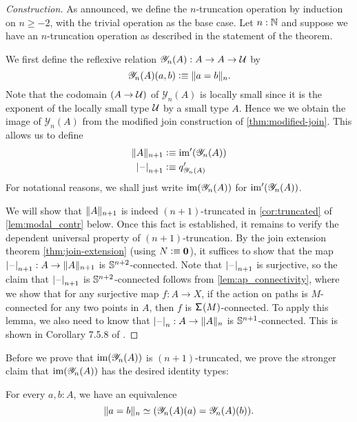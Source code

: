 \begin{proof}[Construction]
As announced, we define the $n$-truncation operation by induction on $n\geq-2$,
with the trivial operation as the base case. Let $n:\N$ and suppose we have
an $n$-truncation operation as described in the statement of the theorem.

We first define the reflexive relation $\mathscr{Y}_n(A) : A \to A \to \UU$ by
\begin{equation*}
\mathscr{Y}_n(A)(a,b) \defeq \trunc{n}{a=b}.
\end{equation*}
Note that the codomain $(A\to\UU)$ of $\mathscr{Y}_n(A)$ is locally small since it is the exponent of
the locally small type $\UU$ by a small type $A$. Hence we we obtain the image
of $\mathscr{Y}_n(A)$ from the modified join construction of \autoref{thm:modified-join}.
This allows us to define
\begin{align*}
\trunc{n+1}{A} & \defeq \im'(\mathscr{Y}_n(A)) \\
\tproj{n+1}{\blank} & \defeq q'_{\mathscr{Y}_n(A)}
\end{align*}
For notational reasons, we shall just write $\im(\mathscr{Y}_n(A))$ for $\im'(\mathscr{Y}_n(A))$. 

We will show that $\trunc{n+1}{A}$ is indeed $(n+1)$-truncated in \autoref{cor:truncated} of \autoref{lem:modal_contr} below. Once this fact is established, it remains to verify the dependent universal property of $(n+1)$-truncation.
By the join extension theorem \autoref{thm:join-extension} (using $N\defeq \emptyt$), it suffices to show that the map $\tproj{n+1}{\blank}:A\to\trunc{n+1}{A}$ is $\sphere{n+2}$-connected. Note that $\tproj{n+1}{\blank}$ is surjective, so the claim that $\tproj{n+1}{\blank}$ is $\sphere{n+2}$-connected follows from \autoref{lem:ap_connectivity}, where we show that for any surjective map $f:A\to X$, if the action on paths is $M$-connected for any two points in $A$, then $f$ is $\susp(M)$-connected. To apply this lemma, we also need to know that $\tproj{n}{\blank}:A\to\trunc{n}{A}$ is $\sphere{n+1}$-connected. This is shown in Corollary 7.5.8 of \cite{hottbook}.
\end{proof}

Before we prove that $\im(\mathscr{Y}_n(A))$ is $(n+1)$-truncated, we prove the stronger claim that $\im(\mathscr{Y}_n(A))$ has the desired identity types:

\begin{lem}\label{lem:modal_contr}
For every $a,b:A$, we have an equivalence
\begin{equation*}
\eqv{\trunc{n}{a=b}}{(\mathscr{Y}_n(A)(a)=\mathscr{Y}_n(A)(b))}.
\end{equation*}
\end{lem}

